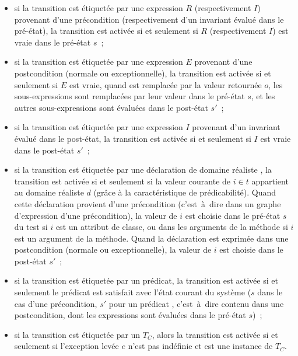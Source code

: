 \begin{itemize}

\item si la transition est étiquetée par une expression $R$ (respectivement
$I$) provenant d'une précondition (respectivement d'un invariant évalué dans le
pré-état), la transition est activée si et seulement si $R$ (respectivement $I$)
est vraie dans le pré-état $s$~;

\item si la transition est étiquetée par une expression $E$ provenant d'une
postcondition (normale ou exceptionnelle), la transition est activée si et
seulement si $E$ est vraie, quand \aresult est remplacée par la valeur retournée
$o$, les sous-expressions \aold{\empty} sont remplacées par leur valeur dans le
pré-état $s$, et les autres sous-expressions sont évaluées dans le post-état
$s'$~;

\item si la transition est étiquetée par une expression $I$ provenant d'un
invariant évalué dans le post-état, la transition est activée si et seulement si
$I$ est vraie dans le post-état $s'$~;

\item si la transition est étiquetée par une déclaration de domaine réaliste
, la transition est activée si et seulement si la valeur courante
de $i \in t$ appartient au domaine réaliste $d$ (grâce à la caractéristique de
prédicabilité). Quand cette déclaration provient d'une précondition
(c'est~à~dire dans un graphe d'expression d'une précondition), la valeur de $i$
est choisie dans le pré-état $s$ du test si $i$ est un attribut de classe, ou
dans les arguments de la méthode si $i$ est un argument de la méthode. Quand la
déclaration est exprimée dans une postcondition (normale ou exceptionnelle), la
valeur de $i$ est choisie dans le post-état $s'$~;

\item si la transition est étiquetée par un prédicat, la transition est activée
si et seulement le prédicat est satisfait avec l'état courant du système ($s$
dans le cas d'une précondition, $s'$ pour un prédicat ,
c'est~à~dire contenu dans une postcondition, dont les expressions \aold{\empty}
sont évaluées dans le pré-état $s$)~;

\item si la transition est étiquetée par un  $T_C$,
alors la transition est activée si et seulement si l'exception levée $e$ n'est
pas indéfinie et est une instance de $T_C$.

\end{itemize}

